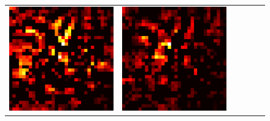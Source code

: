 \documentclass[preprint,12pt]{elsarticle}
\begin{document}
\begin{figure}[p]
\begin{tabular}{cccccc}
  \includegraphics[scale=\scale]{../visualizations/examples/cifar10/cnn/active_saliency_map/0.png} & 
  \includegraphics[scale=\scale]{../visualizations/examples/cifar10/cnn/inactive_saliency_map/0.png} \\
  

\end{tabular}
\end{figure}
\end{document}

